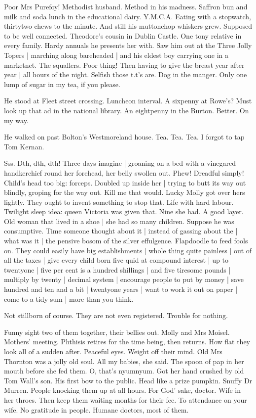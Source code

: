 Poor Mrs Purefoy!
Methodist husband.
Method in his madness.
Saffron bun and milk and soda lunch in the educational dairy.
Y.M.C.A.
Eating with a stopwatch,
thirtytwo chews to the minute.
And still his muttonchop whiskers grew.
Supposed to be well connected.
Theodore's cousin in Dublin Castle.
One tony relative in every family.
Hardy annuals he presents her with.
Saw him out at the Three Jolly Topers |
marching along bareheaded |
and his eldest boy carrying one in a marketnet.
The squallers.
Poor thing!
Then having to give the breast year after year |
all hours of the night.
Selfish those t.t's are.
Dog in the manger.
Only one lump of sugar in my tea,
if you please.

He stood at Fleet street crossing.
Luncheon interval.
A sixpenny at Rowe's?
Must look up that ad in the national library.
An eightpenny in the Burton.
Better.
On my way.

He walked on past Bolton's Westmoreland house.
Tea.
Tea.
Tea.
I forgot to tap Tom Kernan.

Sss.
Dth, dth, dth!
Three days imagine |
groaning on a bed with a vinegared handkerchief round her forehead,
her belly swollen out.
Phew!
Dreadful simply!
Child's head too big:
forceps.
Doubled up inside her |
trying to butt its way out blindly,
groping for the way out.
Kill me that would.
Lucky Molly got over hers lightly.
They ought to invent something to stop that.
Life with hard labour.
Twilight sleep idea:
queen Victoria
was given that.
Nine she had.
A good layer.
Old woman that lived in a shoe |
she had so many children.
Suppose he was consumptive.
Time someone thought about it |
instead of gassing about the |
what was it |
the pensive bosom of the silver effulgence.
Flapdoodle to feed fools on.
They could easily have big establishments |
whole thing quite painless |
out of all the taxes |
give every child born five quid at compound interest |
up to twentyone |
five per cent is a hundred shillings |
and five tiresome pounds |
multiply by twenty |
decimal system |
encourage people to put by money |
save hundred and ten and a bit |
twentyone years |
want to work it out on paper |
come to a tidy sum |
more than you think.

Not stillborn of course.
They are not even registered.
Trouble for nothing.

Funny sight two of them together,
their bellies out.
Molly and Mrs Moisel.
Mothers' meeting.
Phthisis retires for the time being,
then returns.
How flat they look all of a sudden after.
Peaceful eyes.
Weight off their mind.
Old Mrs Thornton was a jolly old soul.
All my babies,
she said.
The spoon of pap in her mouth before she fed them.
O, that's nyumnyum.
Got her hand crushed by old Tom Wall's son.
His first bow to the public.
Head like a prize pumpkin.
Snuffy Dr Murren.
People knocking them up at all hours.
For God' sake, doctor.
Wife in her throes.
Then keep them waiting months for their fee.
To attendance on your wife.
No gratitude in people.
Humane doctors,
most of them.

